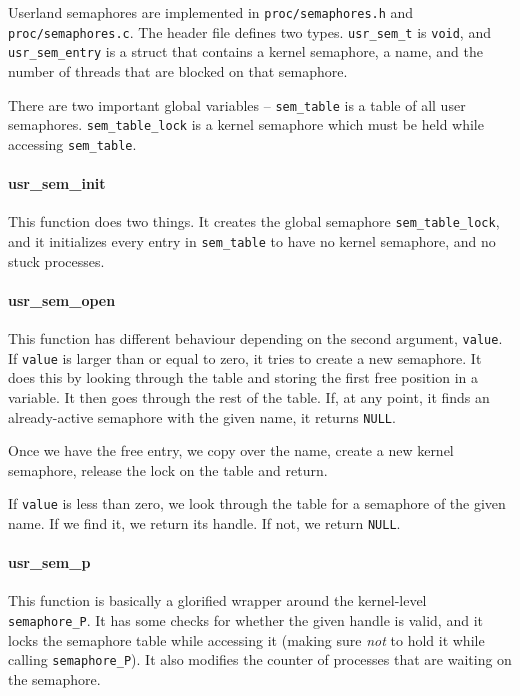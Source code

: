 \documentclass{article}
\begin{document}
Userland semaphores are implemented in \texttt{proc/semaphores.h} and \texttt{proc/semaphores.c}. The header file defines two types. \texttt{usr\_sem\_t} is \texttt{void}, and \texttt{usr\_sem\_entry} is a struct that contains a kernel semaphore, a name, and the number of threads that are blocked on that semaphore.

There are two important global variables -- \texttt{sem\_table} is a table of all user semaphores. \texttt{sem\_table\_lock} is a kernel semaphore which must be held while accessing \texttt{sem\_table}.

\paragraph{usr\_sem\_init}
This function does two things. It creates the global semaphore \texttt{sem\_table\_lock}, and it initializes every entry in \texttt{sem\_table} to have no kernel semaphore, and no stuck processes.

\paragraph{usr\_sem\_open}
This function has different behaviour depending on the second argument, \texttt{value}. If \texttt{value} is larger than or equal to zero, it tries to create a new semaphore. It does this by looking through the table and storing the first free position in a variable. It then goes through the rest of the table. If, at any point, it finds an already-active semaphore with the given name, it returns \texttt{NULL}.

Once we have the free entry, we copy over the name, create a new kernel semaphore, release the lock on the table and return.

If \texttt{value} is less than zero, we look through the table for a semaphore of the given name. If we find it, we return its handle. If not, we return \texttt{NULL}.

\paragraph{usr\_sem\_p}
This function is basically a glorified wrapper around the kernel-level \texttt{semaphore\_P}. It has some checks for whether the given handle is valid, and it locks the semaphore table while accessing it (making sure \emph{not} to hold it while calling \texttt{semaphore\_P}). It also modifies the counter of processes that are waiting on the semaphore.
\end{document}
